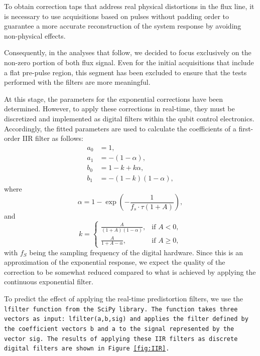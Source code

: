 To obtain correction taps that address real physical distortions in the flux line, it is necessary to use acquisitions based on pulses without padding order to guarantee a more accurate reconstruction of the system response by avoiding non-physical effects.

Consequently, in the analyses that follow, we decided to focus exclusively on the non-zero portion of both flux signal. 
Even for the initial acquisitions that include a flat pre-pulse region, this segment has been excluded to ensure that the tests performed with the filters are more meaningful.

At this stage, the parameters for the exponential corrections have been determined. However, to apply these corrections in real-time, they must be discretized and implemented as digital filters within the qubit control electronics. 
Accordingly, the fitted parameters are used to calculate the coefficients of a first-order IIR filter as follows:
\begin{align}
    a_0 &= 1, \\
    a_1 &= -(1 - \alpha), \\
    b_0 &= 1 - k + k \alpha, \\
    b_1 &= -(1 - k)(1 - \alpha),
\end{align}
where 
\begin{equation}
\alpha = 1 - \exp\left(-\frac{1}{f_s \cdot \tau (1 + A)}\right),
\end{equation}
and
\begin{equation}
    k =
    \begin{cases}
    \frac{A}{(1 + A)(1 - \alpha)}, & \text{if } A < 0, \\
    \frac{A}{1 + A - \alpha}, & \text{if } A \geq 0,
    \end{cases}
\end{equation}
with $f_S$ being the sampling frequency of the digital hardware.
Since this is an approximation of the exponential response, we expect the quality of the correction to be somewhat reduced compared to what is achieved by applying the continuous exponential filter.

To predict the effect of applying the real-time predistortion filters, we use the \tt{lfilter} function from the \tt{SciPy} library. 
The function takes three vectors as input: \tt{lfilter(a,b,sig)} and applies the filter defined by the coefficient vectors \tt{b} and \tt{a} to the signal represented by the vector \tt{sig}. 
The results of applying these IIR filters as discrete digital filters are shown in Figure \ref{fig:IIR}.

